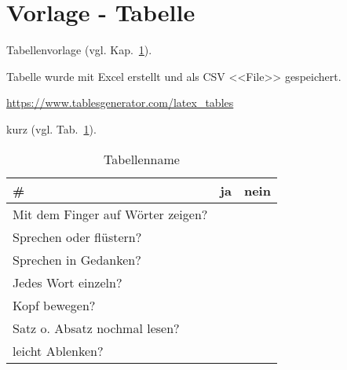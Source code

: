 \section{Vorlage - Tabelle}\label{sec:vorlage_tabelle}

Tabellenvorlage (vgl. Kap.~\ref{sec:vorlage_tabelle}).

Tabelle wurde mit Excel erstellt und als CSV <<File>> gespeichert.

\url{https://www.tablesgenerator.com/latex_tables}


kurz (vgl. Tab.~\ref{tab:tabellenname}). 
\begin{table}[ht]%
\centering
\begin{tabular}{@{}lll@{}}
\toprule
\textbf{\#}                       & \textbf{ja} & \textbf{nein} \\ \midrule
Mit dem Finger auf Wörter zeigen? &             &               \\
Sprechen oder flüstern?           &             &               \\
Sprechen in Gedanken?             &             &               \\
Jedes Wort einzeln?               &             &               \\
Kopf bewegen?                     &             &               \\
Satz o. Absatz nochmal lesen?     &             &               \\
leicht Ablenken?                  &             &               \\ \bottomrule
\end{tabular}%
\caption{Tabellenname}\label{tab:tabellenname}
\end{table}

